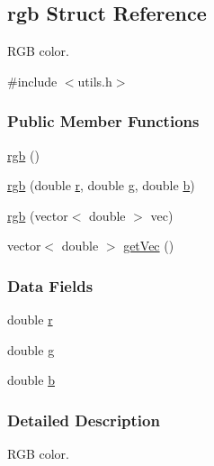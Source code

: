 \hypertarget{structrgb}{\subsection{rgb \-Struct \-Reference}
\label{structrgb}
}


\-R\-G\-B color.  




{\ttfamily \#include $<$utils.\-h$>$}

\subsubsection*{\-Public \-Member \-Functions}
\begin{DoxyCompactItemize}
\item 
\hyperlink{structrgb_accbae622caeb4dad8fe145b371319ccc}{rgb} ()
\item 
\hyperlink{structrgb_ad382cba146d9d2c58844619574020eee}{rgb} (double \hyperlink{structrgb_ad5a38e43f70fb57d6da052745ea5ff90}{r}, double \hyperlink{structrgb_a1c51cad47a05c797643776f9357a8749}{g}, double \hyperlink{structrgb_aa3e45a2c26ad435fe29dfea49f16831e}{b})
\item 
\hyperlink{structrgb_a558536421a12a76d914ea49ade24655c}{rgb} (vector$<$ double $>$ vec)
\item 
vector$<$ double $>$ \hyperlink{structrgb_aaa6d4522cfdd87519f39e5e4bc260517}{get\-Vec} ()
\end{DoxyCompactItemize}
\subsubsection*{\-Data \-Fields}
\begin{DoxyCompactItemize}
\item 
double \hyperlink{structrgb_ad5a38e43f70fb57d6da052745ea5ff90}{r}
\item 
double \hyperlink{structrgb_a1c51cad47a05c797643776f9357a8749}{g}
\item 
double \hyperlink{structrgb_aa3e45a2c26ad435fe29dfea49f16831e}{b}
\end{DoxyCompactItemize}


\subsubsection{\-Detailed \-Description}
\-R\-G\-B color. 

